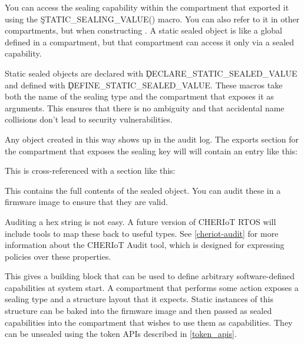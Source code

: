 You can access the sealing capability within the compartment that exported it using the \c{STATIC_SEALING_VALUE()} macro.
You can also refer to it in other compartments, but  when constructing .
A static sealed object is like a global defined in a compartment, but that compartment can access it only via a sealed capability.

Static sealed objects are declared with \c{DECLARE_STATIC_SEALED_VALUE} and defined with \c{DEFINE_STATIC_SEALED_VALUE}.
These macros take both the name of the sealing type and the compartment that exposes it as arguments.
This ensures that there is no ambiguity and that accidental name collisions don't lead to security vulnerabilities.


Any object created in this way shows up in the audit log.
The exports section for the compartment that exposes the sealing key will will contain an entry like this:

\begin{jsonsnippet}
{
  "export_symbol": "__export.sealing_type.alloc.MallocKey",
  "exported": true,
  "kind": "SealingKey"
\},
\end{jsonsnippet}

This is cross-referenced with a section like this:

\begin{jsonsnippet}
{ 
  "contents": "00100000 00000000 00000000 00000000 00000000 00000000",
  "kind": "SealedObject",
  "sealing_type": {
    "compartment": "alloc",
    "key": "MallocKey",
    "provided_by": "build/cheriot/cheriot/release/cheriot.allocator.compartment",
    "symbol": "__export.sealing_type.alloc.MallocKey"
  \}
\},
\end{jsonsnippet}

This contains the full contents of the sealed object.
You can audit these in a firmware image to ensure that they are valid.

\begin{note}
Auditing a hex string is not easy.
A future version of CHERIoT RTOS will include tools to map these back to useful types.
See \ref{cheriot-audit} for more information about the CHERIoT Audit tool, which is designed for expressing policies over these properties.
\end{note}

This gives a building block that can be used to define arbitrary software-defined capabilities at system start.
A compartment that performs some action exposes a sealing type and a structure layout that it expects.
Static instances of this structure can be baked into the firmware image and then passed as sealed capabilities into the compartment that wishes to use them as capabilities.
They can be unsealed using the token APIs described in \ref{token_apis}.

